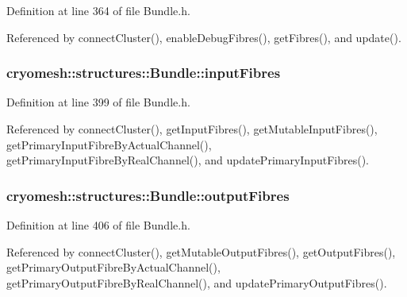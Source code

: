 \-Definition at line 364 of file \-Bundle.\-h.



\-Referenced by connect\-Cluster(), enable\-Debug\-Fibres(), get\-Fibres(), and update().

\hypertarget{classcryomesh_1_1structures_1_1Bundle_aa6a461295021bdfb4ef4cab0f136a2c1}{
\subsubsection[{input\-Fibres}]{ {\bf cryomesh\-::structures\-::\-Bundle\-::input\-Fibres}}}\label{classcryomesh_1_1structures_1_1Bundle_aa6a461295021bdfb4ef4cab0f136a2c1}


\-Definition at line 399 of file \-Bundle.\-h.



\-Referenced by connect\-Cluster(), get\-Input\-Fibres(), get\-Mutable\-Input\-Fibres(), get\-Primary\-Input\-Fibre\-By\-Actual\-Channel(), get\-Primary\-Input\-Fibre\-By\-Real\-Channel(), and update\-Primary\-Input\-Fibres().

\hypertarget{classcryomesh_1_1structures_1_1Bundle_aa671193358b7aba173e45574def3d4c1}{
\subsubsection[{output\-Fibres}]{ {\bf cryomesh\-::structures\-::\-Bundle\-::output\-Fibres}}}\label{classcryomesh_1_1structures_1_1Bundle_aa671193358b7aba173e45574def3d4c1}


\-Definition at line 406 of file \-Bundle.\-h.



\-Referenced by connect\-Cluster(), get\-Mutable\-Output\-Fibres(), get\-Output\-Fibres(), get\-Primary\-Output\-Fibre\-By\-Actual\-Channel(), get\-Primary\-Output\-Fibre\-By\-Real\-Channel(), and update\-Primary\-Output\-Fibres().

